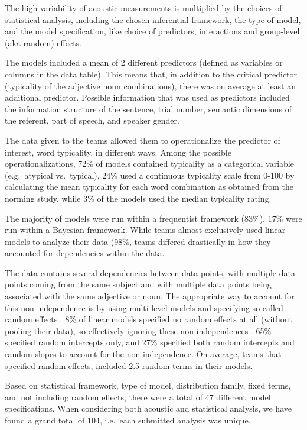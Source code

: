 \documentclass[Review,times,sageh]{sagej}
\begin{document}
The high variability of acoustic measurements is multiplied by the choices of statistical analysis, including the chosen inferential framework, the type of model, and the model specification, like choice of predictors, interactions and group-level (aka random) effects.

The models included a mean of 2 different predictors (defined as variables or columns in the data table).
This means that, in addition to the critical predictor (typicality of the adjective noun combinations), there was on average at least an additional predictor.
Possible information that was used as predictors included the information structure of the sentence, trial number, semantic dimensions of the referent, part of speech, and speaker gender.

The data given to the teams allowed them to operationalize the predictor of interest, word typicality, in different ways.
Among the possible operationalizations, 72\% of models contained typicality as a categorical variable (e.g.~atypical vs.~typical), 24\% used a continuous typicality scale from 0-100 by calculating the mean typicality for each word combination as obtained from the norming study, while 3\% of the models used the median typicality rating.

The majority of models were run within a frequentist framework (83\%).
17\% were run within a Bayesian framework.
While teams almost exclusively used linear models to analyze their data (98\%, teams differed drastically in how they accounted for dependencies within the data.

The data contains several dependencies between data points, with multiple data points coming from the same subject and with multiple data points being associated with the same adjective or noun.
The appropriate way to account for this non-independence is by using multi-level models and specifying so-called random effects \citep[e.g.,][]{gelman2006data, schielzeth2009conclusions}.
8\% of linear models specified no random effects at all (without pooling their data), so effectively ignoring these non-independences \citep{hurlbert1984pseudoreplication}.
65\% specified random intercepts only, and 27\% specified both random intercepts and random slopes to account for the non-independence.
On average, teams that specified random effects, included 2.5 random terms in their models.

Based on statistical framework, type of model, distribution family, fixed terms, and not including random effects, there were a total of 47 different model specifications.
When considering both acoustic and statistical analysis, we have found a grand total of 104, i.e.~each submitted analysis was unique.
\end{document}
